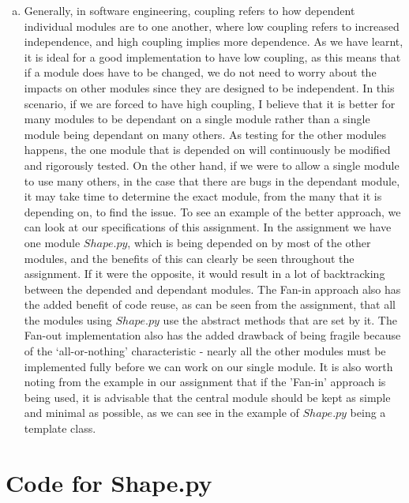 \documentclass[12pt]{article}
\begin{document}
\begin{enumerate}[a)]
\item Generally, in software engineering, coupling refers to how dependent individual modules are to one another, where low coupling refers to increased independence, and high coupling implies more dependence. As we have learnt, it is ideal for a good implementation to have low coupling, as this means that if a module does have to be changed, we do not need to worry about the impacts on other modules since they are designed to be independent. In this scenario, if we are forced to have high coupling, I believe that it is better for many modules to be dependant on a single module rather than a single module being dependant on many others. As testing for the other modules happens, the one module that is depended on will continuously be modified and rigorously tested. On the other hand, if we were to allow a single module to use many others, in the case that there are bugs in the dependant module, it may take time to determine the exact module, from the many that it is depending on, to find the issue. To see an example of the better approach, we can look at our specifications of this assignment. In the assignment we have one module $Shape.py$, which is being depended on by most of the other modules, and the benefits of this can clearly be seen throughout the assignment. If it were the opposite, it would result in a lot of backtracking between the depended and dependant modules. The Fan-in approach also has the added benefit of code reuse, as can be seen from the assignment, that all the modules using $Shape.py$ use the abstract methods that are set by it. The Fan-out implementation also has the added drawback of being fragile because of the `all-or-nothing' characteristic - nearly all the other modules must be implemented fully before we can work on our single module. It is also worth noting from the example in our assignment that if the 'Fan-in' approach is being used, it is advisable that the central module should be kept as simple and minimal as possible, as we can see in the example of $Shape.py$ being a template class.
\end{enumerate}

\newpage

\lstset{language=Python, basicstyle=\tiny, breaklines=true, showspaces=false,
  showstringspaces=false, breakatwhitespace=true}

\def\thesection{\Alph{section}}

\section{Code for Shape.py}
\end{document}
